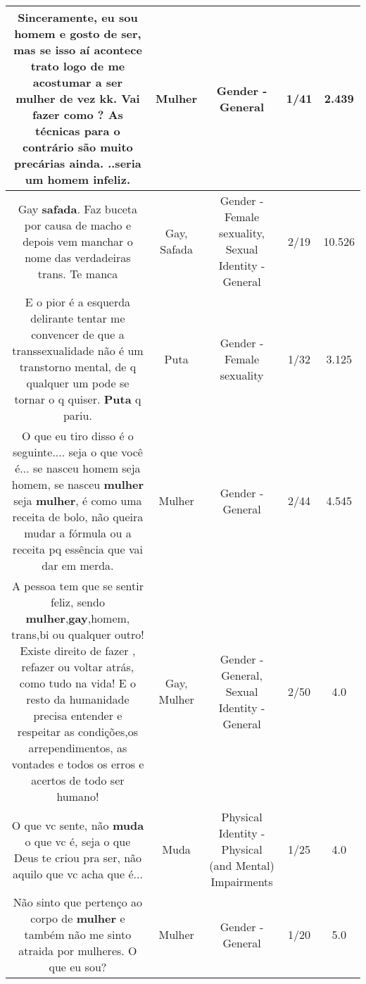 \documentclass[11pt]{article}
\newlength\mylength
\begin{document}
\begin{center}
\begin{longtable}{|C{.65\mylength}|C{.30\mylength}|C{.12\mylength}|C{.12\mylength}|C{.12\mylength}|}
  \small Sinceramente, eu sou homem e gosto de ser, mas se isso aí acontece trato logo de me acostumar a ser \textbf{mulher} de vez kk. Vai fazer como ? As técnicas para o contrário são muito precárias ainda. ..seria um homem infeliz.\normalsize   & Mulher & Gender - General & 1/41 & 2.439 \\  \hline
  \small Gay \textbf{safada}. Faz buceta por causa de macho e depois vem manchar o nome das verdadeiras trans. Te manca\normalsize   & Gay, Safada & Gender - Female sexuality, Sexual Identity - General & 2/19 & 10.526 \\  \hline
  \small E o pior é a esquerda delirante tentar me convencer de que a transsexualidade não é um transtorno mental, de q qualquer um pode se tornar o q quiser. \textbf{Puta} q pariu.\normalsize   & Puta & Gender - Female sexuality & 1/32 & 3.125 \\  \hline
  \small O que eu tiro disso é o seguinte.... seja o que você é... se nasceu homem seja homem, se nasceu \textbf{mulher} seja \textbf{mulher}, é como uma receita de bolo, não queira mudar a fórmula ou a receita pq essência que vai dar em merda.\normalsize   & Mulher & Gender - General & 2/44 & 4.545 \\  \hline
  \small A pessoa tem que se sentir feliz, sendo \textbf{mulher},\textbf{gay},homem, trans,bi  ou qualquer outro! Existe direito de fazer , refazer ou voltar atrás, como tudo na vida!  E o resto da humanidade precisa entender e respeitar as condições,os arrependimentos, as vontades e todos os erros e acertos de todo ser humano!\normalsize   & Gay, Mulher & Gender - General, Sexual Identity - General & 2/50 & 4.0 \\  \hline
  \small O que vc sente, não \textbf{muda} o que vc é, seja o que Deus te criou pra ser, não aquilo que vc acha que é...\normalsize   & Muda & Physical Identity - Physical (and Mental) Impairments & 1/25 & 4.0 \\  \hline
  \small Não sinto que pertenço ao corpo de \textbf{mulher} e também não me sinto atraida por mulheres. O que eu sou?\normalsize   & Mulher & Gender - General & 1/20 & 5.0 \\  \hline

\end{longtable}
\end{center}
\end{document}
